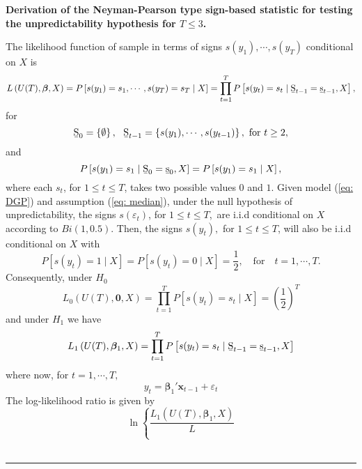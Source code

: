 \documentclass[harvard,11pt]{article}
\newenvironment{proof}[1][Proof]{\textbf{#1.} }{\  \rule{0.5em}{0.5em}}
\begin{document}
\begin{proof}[Derivation of the Neyman-Pearson type sign-based statistic for testing the unpredictability hypothesis for $T\leq 3$]

The likelihood function of sample in terms of signs $s(y_{1}),\cdots,s(y_{T})$ conditional on $X$ is
\begin{equation*}
L\left( U(T),\bm{\beta},X \right) =P\left[
s(y_{1})=s_{1},\cdots,s(y_{T})=s_{T}\mid X\right] =\prod\limits_{t=1}^{T}%
P\left[ s(y_{t})=s_{t}\mid \text{\b{S}}_{t-1}=\text{\b{s}}_{t-1},X\right] ,
\end{equation*}%
for 
\begin{equation*}
\text{\b{S}}_{0}=\left\{ \emptyset \right\} ,\text{ \ \b{S}}_{t-1}=\left\{
s(y_{1}),\cdots,s(y_{t-1})\right\} ,\text{ for }t\geq 2,
\end{equation*}%
and%
\begin{equation*}
P\left[ s(y_{1})=s_{1}\mid \text{\b{S}}_{0}=\text{\b{s}}_{0},X\right] =P%
\left[s(y_{1})=s_{1}\mid X\right] ,
\end{equation*}%
where each $s_{t}$, for $1\leq t\leq T$, takes two possible values $0$ and $%
1 $. Given model (\ref{eq: DGP}) and assumption (\ref{eq: median}), under the null hypothesis of unpredictability, the signs $s(\varepsilon_{t})$, for $1\leq t\leq T$,\ are i.i.d conditional on $X$ according to $Bi(1,0.5)$. Then, the signs $s(y_{t}),$ for $1\leq t\leq T$, will also be i.i.d conditional on $X$
with%
\begin{equation*}
P\left[ s(y_{t})=1\mid X\right] =P\left[ s(y_{t})=0\mid X\right] =%
\frac{1}{2},\quad\text{for}\quad t=1,\cdots,T.
\end{equation*}%
Consequently, under $H_{0}$%
\begin{equation*}
L_{0}\left( U(T),\bm{0},X\right) =\prod\limits_{t=1}^{T}
P\left[ s(y_{t})=s_{t}\mid X\right] =\left( \frac{1}{2}\right) ^{T}
\end{equation*}%
and under $H_1$ we have%
\begin{equation*}
L_1\left( U(T),\bm{\beta} _{1},X\right) =\prod\limits_{t=1}^{T}%
P\left[ s(y_{t})=s_{t}\mid \text{\b{S}}_{t-1}=\text{\b{s}}_{t-1}, X\right]
\end{equation*}%
where now, for $t=1,\cdots,T,$%
\begin{equation*}
y_{t}=\bm{\beta}_1'\bm{x}_{t-1}+\varepsilon_{t}
\end{equation*}%
The log-likelihood ratio is given by%
\begin{equation*}
\ln \left\{ \frac{L_1\left( U(T),\bm{\beta}_{1},X\right) }{L
}
\end{equation*}
\end{proof}
\end{document}
